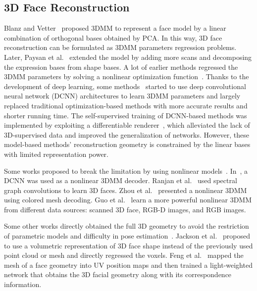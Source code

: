 \documentclass[journal]{IEEEtran}
\begin{document}
	\subsection{3D Face Reconstruction}
	Blanz and Vetter~\cite{Blanz:1999:MMS:311535.311556} proposed 3DMM to represent a face model by a linear combination of orthogonal bases obtained by PCA. In this way, 3D face reconstruction can be formulated as 3DMM parameters regression problems. Later, Paysan et al.~\cite{BFM2009} extended the model by adding more scans and decomposing the expression bases from shape bases. A lot of earlier methods regressed the 3DMM parameters by solving a nonlinear optimization function~\cite{Lee2012,Zhu_2015_CVPR,BFM2009,fit3DMMfeat2015,estimate2005}. Thanks to the development of deep learning, some methods~\cite{Jourabloo_2016_CVPR,3DDFA,Sela_2017_ICCV,very_deep_2017_CVPR,MMFace2019_CVPR,3ddfav2,photoreal,avartame} started to use deep convolutional neural network (DCNN) architectures to learn 3DMM parameters and largely replaced traditional optimization-based methods with more accurate results and shorter running time. The self-supervised training of DCNN-based methods was implemented by exploiting a differentiable renderer~\cite{differential_2018_CVPR,ringnet,GANFIT,multiview_2019_CVPR,multiframe_2019_CVPR,accurateweak,MGC}, which alleviated the lack of 3D-supervised data and improved the generalization of networks.
	However, these model-based methods' reconstruction geometry is constrained by the linear bases with limited representation power.
	
	Some works proposed to break the limitation by using nonlinear models~\cite{disentage_2018_CVPR,Bagautdinov_2018_CVPR,Nonlinear_3DMM,Tran_2019_CVPR,dis_2019_CVPR,disentage_2018_CVPR,ref1}.
	In~\cite{on_learning}, a DCNN was used as a nonlinear 3DMM decoder. Ranjan et al.~\cite{mesh_ae_2018_ECCV} used spectral graph convolutions to learn 3D faces. Zhou et al.~\cite{FPS} presented a nonlinear 3DMM using colored mesh decoding. Guo et al.~\cite{facefromX} learn a more powerful nonlinear 3DMM  from different data sources: scanned 3D face, RGB-D images, and RGB images.
	
	Some other works directly obtained the full 3D geometry to avoid the restriction of parametric models and difficulty in pose estimation~\cite{dualcouple,PRN,mesh_ae_2018_ECCV}. Jackson et al.~\cite{VRN} proposed to use a volumetric representation of 3D face shape instead of the previously used point cloud or mesh and directly regressed the voxels. Feng et al.~\cite{PRN} mapped the mesh of a face geometry into UV position maps and then trained a light-weighted network that obtains the 3D facial geometry along with its correspondence information.
	
\end{document}
